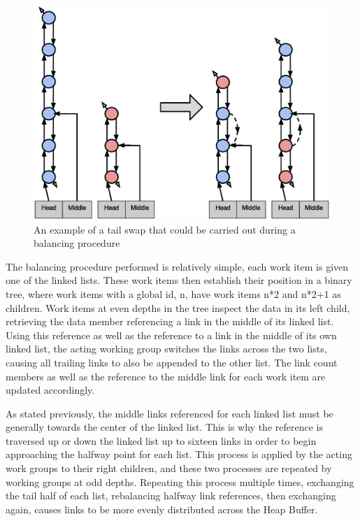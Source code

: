 \documentclass[onecolumn, draftclsnofoot,10pt, compsoc]{IEEEtran}
\begin{document}
\begin{figure}[H]
\begin{center}
\includegraphics[width=\textwidth]{TailSwap.eps}
\caption{An example of a tail swap that could be carried out during a balancing procedure}
\end{center}
\end{figure}


The balancing procedure performed is relatively simple, each work item is given one of the linked lists. These work items then establish their position in a binary tree, where work items with a global id, n, have work items n*2 and n*2+1 as children. Work items at even depths in the tree inspect the data in its left child, retrieving the data member referencing a link in the middle of its linked list. Using this reference as well as the reference to a link in the middle of its own linked list, the acting working group switches the links across the two lists, causing all trailing links to also be appended to the other list. The link count members as well as the reference to the middle link for each work item are updated accordingly.

As stated previously, the middle links referenced for each linked list must be generally towards the center of the linked list. This is why the reference is traversed up or down the linked list up to sixteen links in order to begin approaching the halfway point for each list. This process is applied by the acting work groups to their right children, and these two processes are repeated by working groups at odd depths. Repeating this process multiple times, exchanging the tail half of each list, rebalancing halfway link references, then exchanging again, causes links to be more evenly distributed across the Heap Buffer.
\end{document}
